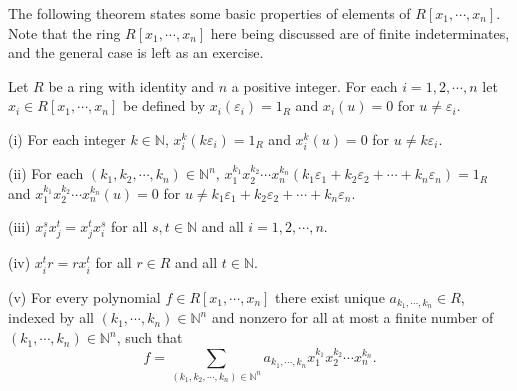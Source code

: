 The following theorem states some basic properties of elements of $R[x_1,\cdots,x_n]$. Note that the ring $R[x_1,\cdots,x_n]$ here being discussed are of finite indeterminates, and the general case is left as an exercise.
\begin{theorem}
Let $R$ be a ring with identity and $n$ a positive integer. For each $i=1,2,\cdots,n$ let $x_i\in R[x_1,\cdots,x_n]$ be defined by $x_i(\varepsilon_i)=1_R$ and $x_i(u)=0$ for $u\ne\varepsilon_i$.\par
(i) For each integer $k\in\mathbb{N}$, $x_i^k(k\varepsilon_i)=1_R$ and $x_i^k(u)=0$ for $u\ne k\varepsilon_i$.\par
(ii) For each $(k_1,k_2,\cdots,k_n)\in\mathbb{N}^n$, $x_{1}^{k_1}x_{2}^{k_2}\cdots x_{n}^{k_n}\left( k_1\varepsilon _1+k_2\varepsilon _2+\cdots +k_n\varepsilon _n \right) =1_R$ and $x_{1}^{k_1}x_{2}^{k_2}\cdots x_{n}^{k_n}\left( u \right) =0$ for $u\ne k_1\varepsilon_1+k_2\varepsilon_2+\cdots+k_n\varepsilon_n$.\par
(iii) $x_{i}^{s}x_{j}^{t}=x_{j}^{t}x_{i}^{s}$ for all $s,t\in\mathbb{N}$ and all $i=1,2,\cdots,n$.\par
(iv) $x_i^tr=rx_i^t$ for all $r\in R$ and all $t\in\mathbb{N}$.\par
(v) For every polynomial $f\in R[x_1,\cdots,x_n]$ there exist unique $a_{k_1,\cdots,k_n}\in R$, indexed by all $(k_1,\cdots,k_n)\in\mathbb{N}^n$ and nonzero for all at most a finite number of $(k_1,\cdots,k_n)\in\mathbb{N}^n$, such that 
$$
f=\sum_{\left( k_1,k_2,\cdots ,k_n \right) \in \mathbb{N} ^n}{a_{k_1,\cdots,k_n}x_{1}^{k_1}x_{2}^{k_2}\cdots x_{n}^{k_n}}.
$$
\end{theorem}
